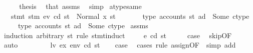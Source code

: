 \begin{isabellebody}
\ \ \isamarkupfalse%
\ \isamarkupfalse%
\ {\isacharquery}{\kern0pt}thesis\ \isamarkupfalse%
\ that\ assms\ \isamarkupfalse%
\ simp\isanewline
{}\isamarkupfalse%
%
\endisatagproof
{\isafoldproof}%
%
\isadelimproof
\isanewline
%
\endisadelimproof
\isanewline
{}\isamarkupfalse%
\ atype{\isacharunderscore}{\kern0pt}same{\isacharcolon}{\kern0pt}\isanewline
\ \ \ {\isachardoublequoteopen}stmt\ stm\ ev\ cd\ st\ {\isacharequal}{\kern0pt}\ Normal\ {\isacharparenleft}{\kern0pt}x{\isacharcomma}{\kern0pt}\ st{\isacharprime}{\kern0pt}{\isacharparenright}{\kern0pt}{\isachardoublequoteclose}\isanewline
\ \ \ \ \ \ \ {\isachardoublequoteopen}type\ {\isacharparenleft}{\kern0pt}accounts\ st\ ad{\isacharparenright}{\kern0pt}\ {\isacharequal}{\kern0pt}\ Some\ ctype{\isachardoublequoteclose}\isanewline
\ \ \ \ \ {\isachardoublequoteopen}type\ {\isacharparenleft}{\kern0pt}accounts\ st{\isacharprime}{\kern0pt}\ ad{\isacharparenright}{\kern0pt}\ {\isacharequal}{\kern0pt}\ Some\ ctype{\isachardoublequoteclose}\isanewline
%
\isadelimproof
%
\endisadelimproof
%
\isatagproof
{}\isamarkupfalse%
\ assms\isanewline
{}\isamarkupfalse%
\ {\isacharparenleft}{\kern0pt}induction\ arbitrary{\isacharcolon}{\kern0pt}\ st{\isacharprime}{\kern0pt}\ rule{\isacharcolon}{\kern0pt}\ stmt{\isachardot}{\kern0pt}induct{\isacharparenright}{\kern0pt}\isanewline
\ \ \isamarkupfalse%
\ {\isacharparenleft}{\kern0pt}{}\ e\ cd\ st{\isacharparenright}{\kern0pt}\isanewline
\ \ \isamarkupfalse%
\ \isamarkupfalse%
\ {\isacharquery}{\kern0pt}case\ \isamarkupfalse%
\ skip{\isacharbrackleft}{\kern0pt}OF\ {}{\isacharparenleft}{\kern0pt}{}{\isacharparenright}{\kern0pt}{\isacharbrackright}{\kern0pt}\ \isamarkupfalse%
\ auto\ \ \ \ \isanewline
{}\isamarkupfalse%
\isanewline
\ \ \isamarkupfalse%
\ {\isacharparenleft}{\kern0pt}{}\ lv\ ex\ env\ cd\ st{\isacharparenright}{\kern0pt}\isanewline
\ \ \isamarkupfalse%
\ {\isacharquery}{\kern0pt}case\ \isamarkupfalse%
\ {\isacharparenleft}{\kern0pt}cases\ rule{\isacharcolon}{\kern0pt}\ assign{\isacharbrackleft}{\kern0pt}OF\ {}{\isacharparenleft}{\kern0pt}{}{\isacharparenright}{\kern0pt}{\isacharbrackright}{\kern0pt}{\isacharsemicolon}{\kern0pt}\ simp\ add{\isacharcolon}{\kern0pt}\ {}{\isacharparenleft}{\kern0pt}{}{\isacharparenright}{\kern0pt}{\isacharparenright}{\kern0pt}\isanewline

\end{isabellebody}
